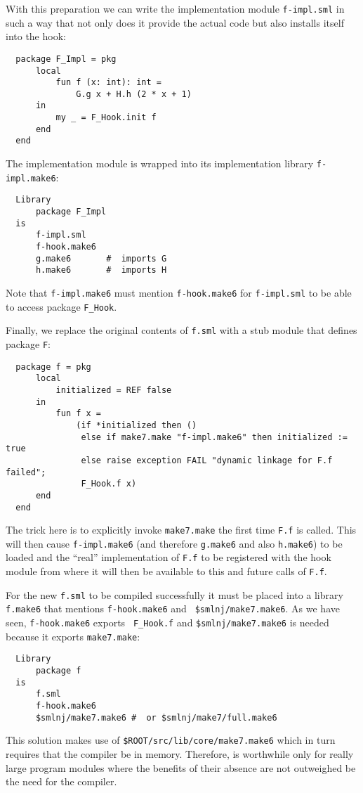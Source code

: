 With this preparation we can write the implementation module {\tt f-impl.sml}
in such a way that not only does it provide the actual
code but also installs itself into the hook:
\begin{verbatim}
  package F_Impl = pkg
      local
          fun f (x: int): int =
              G.g x + H.h (2 * x + 1)
      in
          my _ = F_Hook.init f
      end
  end
\end{verbatim}
\noindent The implementation module is wrapped into its implementation
library {\tt f-impl.make6}:
\begin{verbatim}
  Library
      package F_Impl
  is
      f-impl.sml
      f-hook.make6
      g.make6       #  imports G 
      h.make6       #  imports H 
\end{verbatim}
\noindent Note that {\tt f-impl.make6} must mention {\tt f-hook.make6} for
{\tt f-impl.sml} to be able to access package {\tt F\_Hook}.

Finally, we replace the original contents of {\tt f.sml} with a stub
module that defines package {\tt F}:
\begin{verbatim}
  package f = pkg
      local
          initialized = REF false
      in
          fun f x =
              (if *initialized then ()
               else if make7.make "f-impl.make6" then initialized := true
               else raise exception FAIL "dynamic linkage for F.f failed";
               F_Hook.f x)
      end
  end
\end{verbatim}
\noindent The trick here is to explicitly invoke {\tt make7.make} the
first time {\tt F.f} is called.  This will then cause {\tt f-impl.make6}
(and therefore {\tt g.make6} and also {\tt h.make6}) to be loaded and the
``real'' implementation of {\tt F.f} to be registered with the hook
module from where it will then be available to this and future calls
of {\tt F.f}.

For the new {\tt f.sml} to be compiled successfully it must be placed
into a library {\tt f.make6} that mentions {\tt f-hook.make6} and {\tt
\$smlnj/make7.make6}.  As we have seen, {\tt f-hook.make6} exports {\tt
F\_Hook.f} and {\tt \$smlnj/make7.make6} is needed because it exports
{\tt make7.make}:

\begin{verbatim}
  Library
      package f
  is
      f.sml
      f-hook.make6
      $smlnj/make7.make6 #  or $smlnj/make7/full.make6 
\end{verbatim}

  This solution makes use of {\tt \$ROOT/src/lib/core/make7.make6}
which in turn requires that the compiler be in memory.  Therefore,
is worthwhile only for really large program modules where the benefits
of their absence are not outweighed be the need for the compiler.
